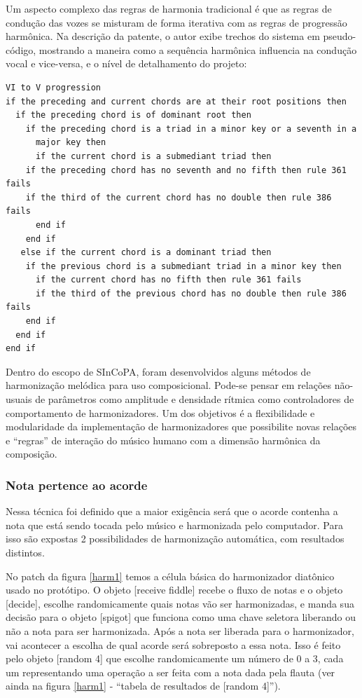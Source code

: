 \documentclass{ppgmus}
\begin{document}
Um aspecto complexo das regras de harmonia tradicional é que as regras
de condução das vozes se misturam de forma iterativa com as regras de
progressão harmônica. Na descrição da patente, o autor exibe trechos do sistema em pseudo-código,
mostrando a maneira como a sequência harmônica influencia na condução vocal e vice-versa,
e o nível de detalhamento do projeto:

\singlespacing
\footnotesize
\begin{verbatim}
VI to V progression
if the preceding and current chords are at their root positions then
  if the preceding chord is of dominant root then
    if the preceding chord is a triad in a minor key or a seventh in a 
      major key then
      if the current chord is a submediant triad then
	if the preceding chord has no seventh and no fifth then rule 361 fails
	if the third of the current chord has no double then rule 386 fails
      end if
    end if
   else if the current chord is a dominant triad then
    if the previous chord is a submediant triad in a minor key then
      if the current chord has no fifth then rule 361 fails
      if the third of the previous chord has no double then rule 386 fails
    end if
  end if
end if
\end{verbatim}
\normalsize
\doublespacing

Dentro do escopo de SInCoPA, foram desenvolvidos alguns métodos de harmonização
melódica para uso composicional.
Pode-se pensar em relações não-usuais de parâmetros
como amplitude e densidade rítmica como controladores de 
comportamento de harmonizadores. 
Um dos objetivos é a flexibilidade e modularidade da implementação
de harmonizadores que possibilite novas relações e ``regras'' de
interação do músico humano com a dimensão harmônica da
composição. 


\subsubsection{Nota pertence ao acorde}
\label{harm-notapertence}

Nessa técnica foi definido que a maior exigência será que o acorde contenha a nota que está sendo
tocada pelo músico e harmonizada pelo computador. 
Para isso são expostas 2 possibilidades de harmonização automática, com resultados distintos.

No patch da figura \ref{harm1}  temos a célula básica do harmonizador diatônico 
 usado no protótipo. 
O objeto [receive fiddle] recebe o fluxo de notas e o objeto [decide], escolhe 
randomicamente quais notas vão ser harmonizadas, e manda sua decisão para o objeto 
[spigot] que funciona como uma chave seletora liberando ou não a nota para ser harmonizada. 
Após a nota ser liberada para o harmonizador, vai acontecer  a escolha de qual acorde será 
sobreposto a essa nota. Isso é feito pelo objeto [random 4] que escolhe randomicamente um 
número de 0 a 3, cada um representando uma operação a ser feita com a nota dada pela flauta 
(ver ainda na figura \ref{harm1} - ``tabela de resultados de [random 4]'').
\end{document}

